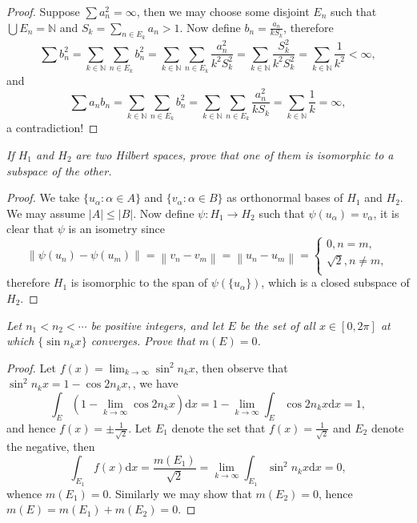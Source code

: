 \begin{proof}
Suppose $\sum a_n^2=\infty$, then we may choose some disjoint $E_n$ such that $\bigcup E_n=\mathbb{N}$ and $S_k=\sum_{n\in E_k}a_n>1$. Now define $b_n=\frac{a_n}{kS_k}$, therefore 
$$
\sum{b_{n}^{2}}=\sum_{k\in \mathbb{N}}{\sum_{n\in E_k}{b_{n}^{2}}}=\sum_{k\in \mathbb{N}}{\sum_{n\in E_k}{\frac{a_{n}^{2}}{k^2S_{k}^{2}}}}=\sum_{k\in \mathbb{N}}{\frac{S_{k}^{2}}{k^2S_{k}^{2}}}=\sum_{k\in \mathbb{N}}{\frac{1}{k^2}}<\infty ,
$$
and 
$$
\sum{a_nb_n}=\sum_{k\in \mathbb{N}}{\sum_{n\in E_k}{b_{n}^{2}}}=\sum_{k\in \mathbb{N}}{\sum_{n\in E_k}{\frac{a_{n}^{2}}{kS_k}}}=\sum_{k\in \mathbb{N}}{\frac{1}{k}}=\infty ,
$$
a contradiction!
\end{proof}
\begin{problem}\em
If $H_1$ and $H_2$ are two Hilbert spaces, prove that one of them is isomorphic to a subspace of the other.
\end{problem}
\begin{proof}
We take $\{u_\alpha:\alpha\in A\}$ and $\{v_\alpha:\alpha\in B\}$ as orthonormal bases of $H_1$ and $H_2$. We may assume $|A|\le |B|$. Now define $\psi:H_1\to H_2$ such that $\psi(u_\alpha)=v_\alpha$, it is clear that $\psi$ is an isometry since 
$$
\left\| \psi \left( u_n \right) -\psi \left( u_m \right) \right\| =\left\| v_n-v_m \right\| =\left\| u_n-u_m \right\| =\begin{cases}
	0,n=m,\\
	\sqrt{2},n\ne m,\\
\end{cases}
$$
therefore $H_1$ is isomorphic to the span of $\psi(\{u_\alpha\})$, which is a closed subspace of $H_2$.
\end{proof}
\begin{problem}\em
Let $n_1<n_2<\cdots$ be positive integers, and let $E$ be the set of all $x\in[0,2\pi]$ at which $\{\sin n_kx\}$ converges. Prove that $m(E)=0$.
\end{problem}
\begin{proof}
Let $f\left( x \right) =\lim_{k\rightarrow \infty} \sin ^2n_kx$, then observe that $\sin ^2n_kx=1-\cos 2n_kx,$, we have 
$$
\int_E{\left( 1-\lim_{k\rightarrow \infty} \cos 2n_kx \right) \mathrm{d}x}=1-\lim_{k\rightarrow \infty} \int_E{\cos 2n_kx\mathrm{d}x}=1,
$$
and hence $f(x)=\pm\frac{1}{\sqrt{2}}$. Let $E_1$ denote the set that $f(x)=\frac{1}{\sqrt{2}}$ and $E_2$ denote the negative, then 
$$
\int_{E_1}{f\left( x \right) \mathrm{d}x}=\frac{m\left( E_1 \right)}{\sqrt{2}}=\lim_{k\rightarrow \infty} \int_{E_1}{\sin ^2n_kx\mathrm{d}x}=0,
$$
whence $m(E_1)=0$. Similarly we may show that $m(E_2)=0$, hence $m(E)=m(E_1)+m(E_2)=0$.
\end{proof}
